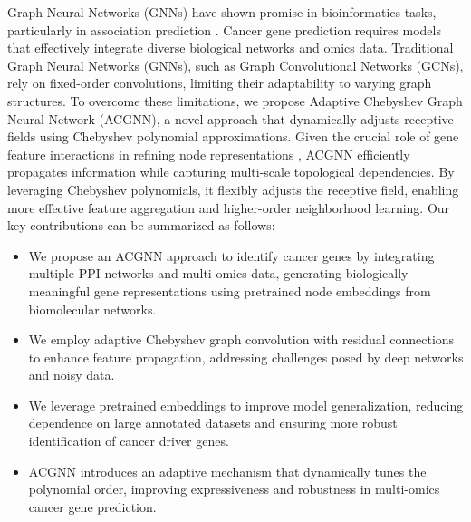 Graph Neural Networks (GNNs) \cite{scarselli2009graph} have shown promise in bioinformatics tasks, particularly in association prediction \cite{liu2022conversational,peng2022drugresponse,peng2022cancerdrugresponse}. Cancer gene prediction requires models that effectively integrate diverse biological networks and omics data. Traditional Graph Neural Networks (GNNs), such as Graph Convolutional Networks (GCNs), rely on fixed-order convolutions, limiting their adaptability to varying graph structures. To overcome these limitations, we propose Adaptive Chebyshev Graph Neural Network (ACGNN), a novel approach that dynamically adjusts receptive fields using Chebyshev polynomial approximations.
Given the crucial role of gene feature interactions in refining node representations \cite{albu2022approach}, ACGNN efficiently propagates information while capturing multi-scale topological dependencies. By leveraging Chebyshev polynomials, it flexibly adjusts the receptive field, enabling more effective feature aggregation and higher-order neighborhood learning. 
Our key contributions can be summarized as follows:  
\begin{itemize}  
	\item We propose an ACGNN approach to identify cancer genes by integrating multiple PPI networks and multi-omics data, generating biologically meaningful gene representations using pretrained node embeddings from biomolecular networks.  
	\item We employ adaptive Chebyshev graph convolution with residual connections to enhance feature propagation, addressing challenges posed by deep networks and noisy data.  
	\item We leverage pretrained embeddings to improve model generalization, reducing dependence on large annotated datasets and ensuring more robust identification of cancer driver genes.  
	\item ACGNN introduces an adaptive mechanism that dynamically tunes the polynomial order, improving expressiveness and robustness in multi-omics cancer gene prediction.  
\end{itemize}








